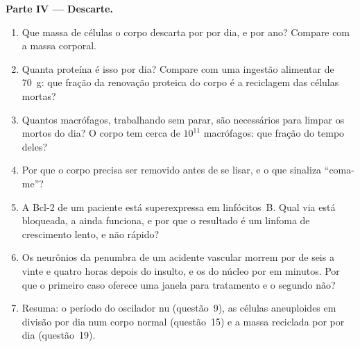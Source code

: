 \begin{problem}
\medskip
\noindent\textbf{Parte IV --- Descarte.}
\begin{enumerate}[resume]
  \item Que massa de células o corpo descarta por  por dia, e
        por ano? Compare com a massa corporal.
  \item Quanta proteína é isso por dia? Compare com uma ingestão
        alimentar de \qty{70}{g}: que fração da renovação proteica do
        corpo é a reciclagem das células mortas?
  \item Quantos macrófagos, trabalhando sem parar, são necessários para
        limpar os mortos do dia? O corpo tem cerca de $10^{11}$
        macrófagos: que fração do tempo deles?
  \item Por que o corpo precisa ser removido antes de se lisar, e o que
        sinaliza ``coma-me''?
  \item A Bcl-2 de um paciente está superexpressa em linfócitos~B. Qual
        via está bloqueada, a  ainda funciona, e por que o
        resultado é um linfoma de crescimento lento, e não rápido?
  \item Os neurônios da penumbra de um acidente vascular morrem por
         de seis a vinte e quatro horas depois do insulto, e os
        do núcleo por  em minutos. Por que o primeiro caso
        oferece uma janela para tratamento e o segundo não?
  \item Resuma: o período do oscilador nu (questão~9), as células
        aneuploides em divisão por dia num corpo normal (questão~15) e a
        massa reciclada por  por dia (questão~19).
\end{enumerate}
\end{problem}
